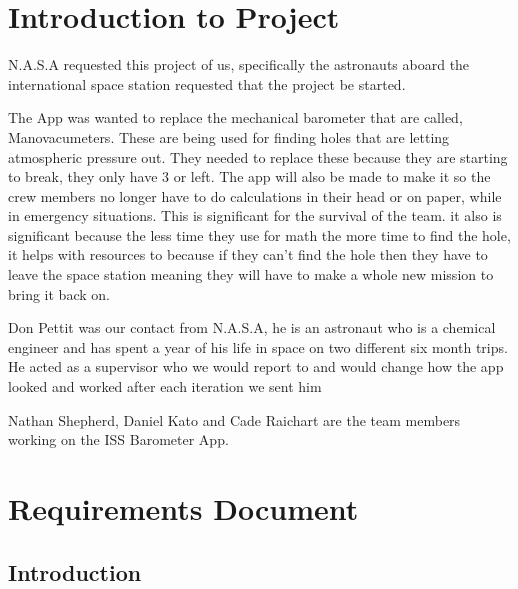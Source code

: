 \documentclass[onecolumn, draftclsnofoot,10pt, compsoc]{IEEEtran}
\begin{document}

\section{Introduction to Project}

N.A.S.A requested this project of us, specifically the astronauts aboard the international space station requested that the project be started. 

The App was wanted to replace the mechanical barometer that are called, Manovacumeters. These are being used for finding holes that are letting atmospheric pressure out. They needed to replace these because they are starting to break, they only have 3 or left. The app will also be made to make it so the crew members no longer have to do calculations in their head or on paper, while in emergency situations. This is significant for the survival of the team. it also is significant because the less time they use for math the more time to find the hole, it helps with resources to because if they can't find the hole then they have to leave the space station meaning they will have to make a whole new mission to bring it back on. 

Don Pettit was our contact from N.A.S.A, he is an astronaut who is a chemical engineer and has spent a year of his life in space on two different six month trips. He acted as a supervisor who we would report to and would change how the app looked and worked after each iteration we sent him 

 Nathan Shepherd, Daniel Kato and Cade Raichart are the team members working on the ISS Barometer App. 

\section{Requirements Document}

\subsection{Introduction}
\end{document}
